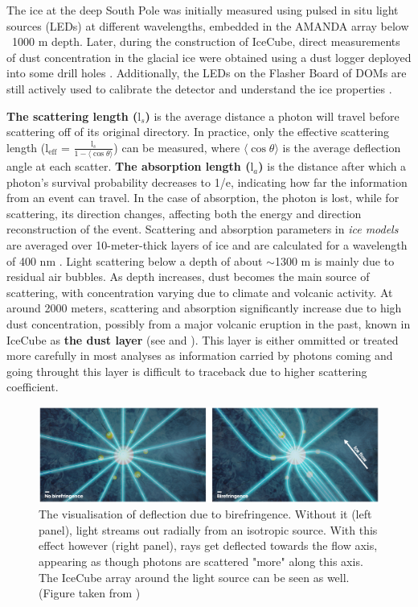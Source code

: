 The ice at the deep South Pole was initially measured using pulsed in situ light sources (LEDs) at different wavelengths, embedded in the AMANDA array below ~1000 m depth. Later, during the construction of IceCube, direct measurements of dust concentration in the glacial ice were obtained using a dust logger deployed into some drill holes . Additionally, the LEDs on the Flasher Board of DOMs are still actively used to calibrate the detector and understand the ice properties . 

\textbf{The scattering length ($\mathrm{l}_s$)} is the average distance a photon will travel before scattering off of its original directory. In practice, only the effective scattering length ($\mathrm{l}_\mathrm{eff}$ = $\frac{\mathrm{l}_s}{1 - \langle\cos\theta\rangle}$) can be measured, where $\langle\cos\theta\rangle$ is the average deflection angle at each scatter. \textbf{The absorption length ($\mathrm{l}_a$)} is the distance after which a photon's survival probability decreases to 1/e, indicating how far the information from an event can travel. In the case of absorption, the photon is lost, while for scattering, its direction changes, affecting both the energy and direction reconstruction of the event. Scattering and absorption parameters in \emph{ice models} are averaged over 10-meter-thick layers of ice and are calculated for a wavelength of 400 nm \cite{spicemie}. Light scattering below a depth of about $\sim$1300 m is mainly due to residual air bubbles. As depth increases, dust becomes the main source of scattering, with concentration varying due to climate and volcanic activity. At around 2000 meters, scattering and absorption significantly increase due to high dust concentration, possibly from a major volcanic eruption in the past, known in IceCube as \textbf{the dust layer}  (see  and ). This layer is either ommitted or treated more carefully in most analyses as information carried by photons coming and going throught this layer is difficult to traceback due to higher scattering coefficient.
\begin{figure}
	\centering \includegraphics{./figures/nu_in_icecube/bfr_illustration.png}
	\caption[The visualisation of deflection due to birefringence]{The visualisation of deflection due to birefringence. Without it (left panel), light streams out radially from an isotropic source. With this effect however (right panel), rays get deflected towards the flow axis, appearing as though photons are scattered "more" along this axis. The IceCube array around the light source can be seen as well. (Figure taken from \cite{BFR_paper})}
\end{figure}

